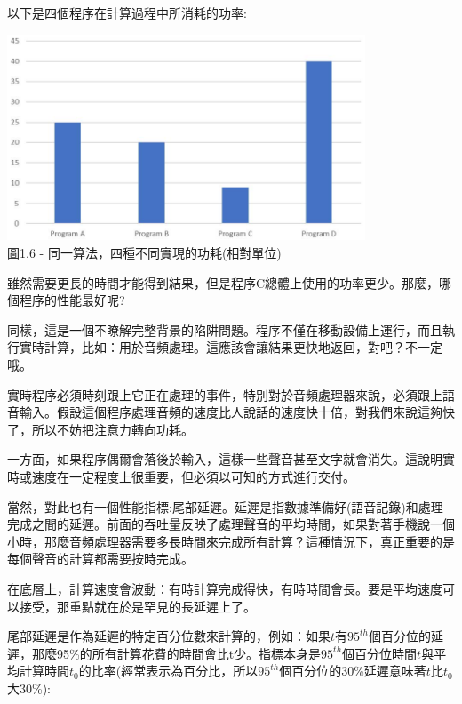 
以下是四個程序在計算過程中所消耗的功率:

\begin{center}
\includegraphics[width=0.8\textwidth]{content/1/chapter1/images/6.jpg}\\
圖1.6 - 同一算法，四種不同實現的功耗(相對單位)
\end{center}

雖然需要更長的時間才能得到結果，但是程序C總體上使用的功率更少。那麼，哪個程序的性能最好呢?

同樣，這是一個不瞭解完整背景的陷阱問題。程序不僅在移動設備上運行，而且執行實時計算，比如：用於音頻處理。這應該會讓結果更快地返回，對吧？不一定哦。


實時程序必須時刻跟上它正在處理的事件，特別對於音頻處理器來說，必須跟上語音輸入。假設這個程序處理音頻的速度比人說話的速度快十倍，對我們來說這夠快了，所以不妨把注意力轉向功耗。

一方面，如果程序偶爾會落後於輸入，這樣一些聲音甚至文字就會消失。這說明實時或速度在一定程度上很重要，但必須以可知的方式進行交付。

當然，對此也有一個性能指標:尾部延遲。延遲是指數據準備好(語音記錄)和處理完成之間的延遲。前面的吞吐量反映了處理聲音的平均時間，如果對著手機說一個小時，那麼音頻處理器需要多長時間來完成所有計算？這種情況下，真正重要的是每個聲音的計算都需要按時完成。

在底層上，計算速度會波動：有時計算完成得快，有時時間會長。要是平均速度可以接受，那重點就在於是罕見的長延遲上了。

尾部延遲是作為延遲的特定百分位數來計算的，例如：如果$ t $有$95^{th}$個百分位的延遲，那麼95\%的所有計算花費的時間會比t少。指標本身是$95^{th}$個百分位時間$ t $與平均計算時間$ t_0 $的比率(經常表示為百分比，所以$95^{th}$個百分位的30\%延遲意味著$ t $比$ t_0 $大30\%):

